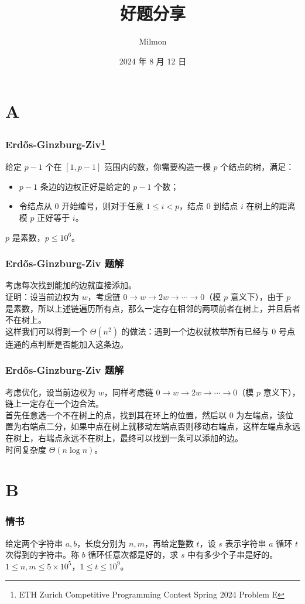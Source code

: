 \documentclass{beamer}
\title[好题分享]{好题分享}
\author{Milmon}
\institute[Hailiang Junior High School]
{
Hailiang Junior High School
}
\date{2024 年 8 月 12 日}
\begin{document}
\begin{frame}
\titlepage
\end{frame}

\section{A}

\begin{frame}
\frametitle{Erdős-Ginzburg-Ziv\footnote{ETH Zurich Competitive Programming Contest Spring 2024 Problem E}}
给定 $p - 1$ 个在 $[1, p - 1]$ 范围内的数，你需要构造一棵 $p$ 个结点的树，满足：
\begin{itemize}
\item $p - 1$ 条边的边权正好是给定的 $p - 1$ 个数；
\item 令结点从 $0$ 开始编号，则对于任意 $1 \leq i < p$，结点 $0$ 到结点 $i$ 在树上的距离模 $p$ 正好等于 $i$。
\end{itemize}
$p$ 是素数，$p \leq 10^6$。
\end{frame}

\begin{frame}
\frametitle{Erdős-Ginzburg-Ziv 题解}
考虑每次找到能加的边就直接添加。\\
\pause
证明：设当前边权为 $w$，考虑链 $0 \to w \to 2w \to \cdots \to 0$（模 $p$ 意义下），由于 $p$ 是素数，所以上述链遍历所有点，那么一定存在相邻的两项前者在树上，并且后者不在树上。\\
\pause
这样我们可以得到一个 $\Theta(n^2)$ 的做法：遇到一个边权就枚举所有已经与 $0$ 号点连通的点判断是否能加入这条边。
\end{frame}

\begin{frame}
\frametitle{Erdős-Ginzburg-Ziv 题解}
考虑优化，设当前边权为 $w$，同样考虑链 $0 \to w \to 2w \to \cdots \to 0$（模 $p$ 意义下），链上一定存在一个边合法。\\
\pause
首先任意选一个不在树上的点，找到其在环上的位置，然后以 $0$ 为左端点，该位置为右端点二分，如果中点在树上就移动左端点否则移动右端点，这样左端点永远在树上，右端点永远不在树上，最终可以找到一条可以添加的边。\\
\pause
时间复杂度 $\Theta(n \log n)$。
\end{frame}

\section{B}

\begin{frame}
\frametitle{情书}
给定两个字符串 $a, b$，长度分别为 $n, m$，再给定整数 $t$，设 $s$ 表示字符串 $a$ 循环 $t$ 次得到的字符串。称 $b$ 循环任意次都是好的，求 $s$ 中有多少个子串是好的。\\
$1 \leq n, m \leq 5 \times 10^5$，$1 \leq t \leq 10^9$。
\end{frame}
\end{document}
